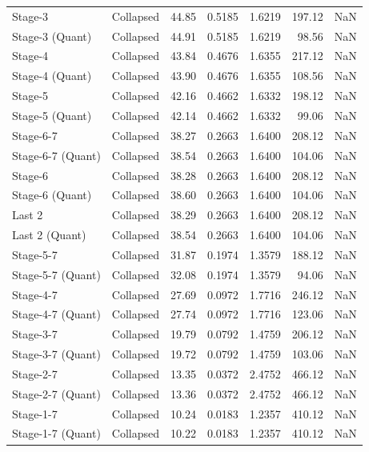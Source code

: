 \begin{table}
\begin{tabular}{llrrrrl}
Stage-3 & Collapsed & 44.85 & 0.5185 & 1.6219 & 197.12 & NaN \\
Stage-3
(Quant) & Collapsed & 44.91 & 0.5185 & 1.6219 & 98.56 & NaN \\
Stage-4 & Collapsed & 43.84 & 0.4676 & 1.6355 & 217.12 & NaN \\
Stage-4
(Quant) & Collapsed & 43.90 & 0.4676 & 1.6355 & 108.56 & NaN \\
Stage-5 & Collapsed & 42.16 & 0.4662 & 1.6332 & 198.12 & NaN \\
Stage-5
(Quant) & Collapsed & 42.14 & 0.4662 & 1.6332 & 99.06 & NaN \\
Stage-6-7 & Collapsed & 38.27 & 0.2663 & 1.6400 & 208.12 & NaN \\
Stage-6-7
(Quant) & Collapsed & 38.54 & 0.2663 & 1.6400 & 104.06 & NaN \\
Stage-6 & Collapsed & 38.28 & 0.2663 & 1.6400 & 208.12 & NaN \\
Stage-6
(Quant) & Collapsed & 38.60 & 0.2663 & 1.6400 & 104.06 & NaN \\
Last 2 & Collapsed & 38.29 & 0.2663 & 1.6400 & 208.12 & NaN \\
Last 2
(Quant) & Collapsed & 38.54 & 0.2663 & 1.6400 & 104.06 & NaN \\
Stage-5-7 & Collapsed & 31.87 & 0.1974 & 1.3579 & 188.12 & NaN \\
Stage-5-7
(Quant) & Collapsed & 32.08 & 0.1974 & 1.3579 & 94.06 & NaN \\
Stage-4-7 & Collapsed & 27.69 & 0.0972 & 1.7716 & 246.12 & NaN \\
Stage-4-7
(Quant) & Collapsed & 27.74 & 0.0972 & 1.7716 & 123.06 & NaN \\
Stage-3-7 & Collapsed & 19.79 & 0.0792 & 1.4759 & 206.12 & NaN \\
Stage-3-7
(Quant) & Collapsed & 19.72 & 0.0792 & 1.4759 & 103.06 & NaN \\
Stage-2-7 & Collapsed & 13.35 & 0.0372 & 2.4752 & 466.12 & NaN \\
Stage-2-7
(Quant) & Collapsed & 13.36 & 0.0372 & 2.4752 & 466.12 & NaN \\
Stage-1-7 & Collapsed & 10.24 & 0.0183 & 1.2357 & 410.12 & NaN \\
Stage-1-7
(Quant) & Collapsed & 10.22 & 0.0183 & 1.2357 & 410.12 & NaN \\
\bottomrule
\end{tabular}
\end{table}
